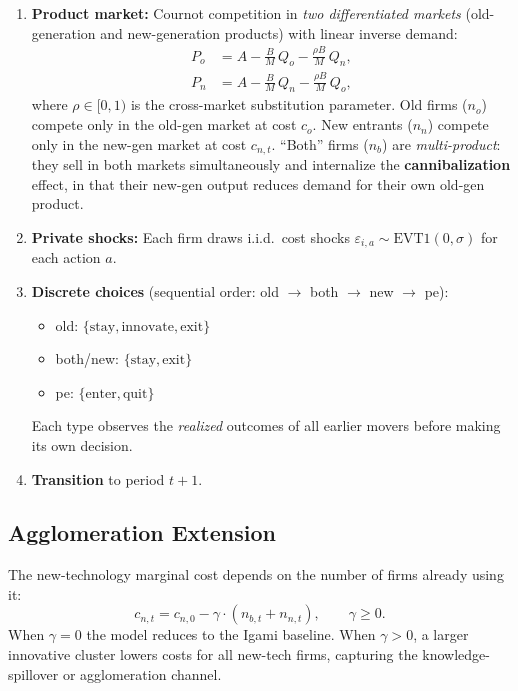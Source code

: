 \documentclass[12pt]{article}
\begin{document}
\begin{enumerate}
  \item \textbf{Product market:} Cournot competition in \emph{two
        differentiated markets} (old-generation and new-generation products)
        with linear inverse demand:
        \begin{align}
          P_o &= A - \frac{B}{M}\,Q_o - \frac{\rho B}{M}\,Q_n, \label{eq:demand_o}\\
          P_n &= A - \frac{B}{M}\,Q_n - \frac{\rho B}{M}\,Q_o, \label{eq:demand_n}
        \end{align}
        where $\rho \in [0,1)$ is the cross-market substitution parameter.
        Old firms ($n_o$) compete only in the old-gen market at cost $c_o$.
        New entrants ($n_n$) compete only in the new-gen market at cost
        $c_{n,t}$. ``Both'' firms ($n_b$) are \emph{multi-product}: they sell
        in both markets simultaneously and internalize the
        \textbf{cannibalization} effect, in that their new-gen output reduces
        demand for their own old-gen product.
  \item \textbf{Private shocks:} Each firm draws i.i.d.\ cost shocks
        $\varepsilon_{i,a} \sim \mathrm{EVT1}(0, \sigma)$ for each action $a$.
  \item \textbf{Discrete choices} (sequential order: old $\to$ both $\to$ new $\to$ pe):
        \begin{itemize}
          \item old: $\{\text{stay}, \text{innovate}, \text{exit}\}$
          \item both/new: $\{\text{stay}, \text{exit}\}$
          \item pe: $\{\text{enter}, \text{quit}\}$
        \end{itemize}
        Each type observes the \emph{realized} outcomes of all earlier movers
        before making its own decision.
  \item \textbf{Transition} to period $t+1$.
\end{enumerate}

\subsection{Agglomeration Extension}

The new-technology marginal cost depends on the number of firms already using it:
\begin{equation}
  c_{n,t} = c_{n,0} - \gamma \cdot (n_{b,t} + n_{n,t}), \qquad \gamma \geq 0.
  \label{eq:agglom}
\end{equation}
When $\gamma = 0$ the model reduces to the Igami baseline. When $\gamma > 0$,
a larger innovative cluster lowers costs for all new-tech firms, capturing
the knowledge-spillover or agglomeration channel.
\end{document}
